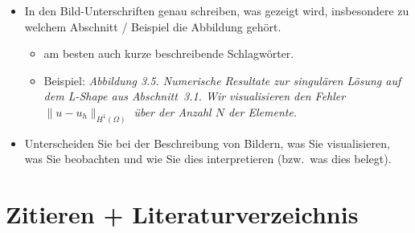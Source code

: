 \documentclass[a4paper,11pt,bibliography=totoc,listof=totoc,headinclude=true,cleardoublepage=empty,oneside]{scrbook}
\begin{document}
{\color{change}
\begin{itemize}
\item In den Bild-Unterschriften genau schreiben, was gezeigt wird, insbesondere zu welchem Abschnitt / Beispiel die Abbildung gehört.
\begin{itemize}
\item am besten auch kurze beschreibende Schlagwörter.
\item Beispiel: \emph{Abbildung 3.5. Numerische Resultate zur singulären Lösung auf dem L-Shape aus  Abschnitt~3.1. Wir visualisieren den Fehler $\|u-u_h\|_{H^1(\Omega)}$ über der Anzahl $N$ der Elemente.}
\end{itemize}

\item Unterscheiden Sie bei der Beschreibung von Bildern, was Sie visualisieren, was Sie beobachten und wie Sie dies interpretieren (bzw.\ was dies belegt).

\end{itemize}
}

\section{Zitieren + Literaturverzeichnis}
\end{document}
